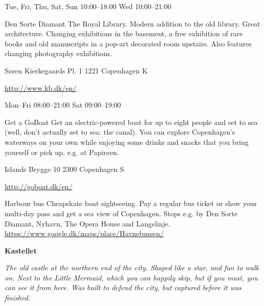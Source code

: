 \begin{left}
\begin{funitem}
{\begin{ohours}
{Tue, Fri, Thu, Sat, Sun}
{10:00–18:00}
{Wed}
{10:00–21:00}
{}
{}
{}
{}
\end{ohours}}
\end{funitem}
\begin{funitem}
{Den Sorte Diamant}
{The Royal Library. Modern addition to the old library. Great architecture. Changing exhibitions in the basement, a free exhibition of rare books and old manuscripts in a pop-art decorated room upstairs. Also features changing photography exhibitions.}
{\begin{addr}
{Søren Kierkegaards Pl. 1}
{1221 Copenhagen K}
\end{addr}}
{\url{http://www.kb.dk/en/}}
{\begin{ohours}
{Mon–Fri}
{08:00–21:00}
{Sat}
{09:00–19:00}
{}
{}
{}
{}
\end{ohours}}
\end{funitem}
\begin{funitem}
{Get a GoBoat}
{Get an electric-powered boat for up to eight people and set to sea (well, don’t actually set to sea: the canal). You can explore Copenhagen’s waterways on your own while enjoying some drinks and snacks that you bring yourself or pick up, e.g. at Papirøen.}
{\begin{addr}
{Islands Brygge 10}
{2300 Copenhagen S}
\end{addr}}
{\url{http://goboat.dk/en/}}
{\begin{ohours}
{}
{}
{}
{}
{}
{}
{}
{}
\end{ohours}}
\end{funitem}
\begin{funitemshort}
{Harbour bus}
{Cheapskate boat sightseeing. Pay a regular bus ticket or show your multi-day pass  and get a sea view of Copenhagen. Stops e.g. by Den Sorte Diamant, Nyhavn, The Opera House and Langelinje.}
{\url{https://www.google.dk/maps/place/Havnebussen/ }}
\end{funitemshort}
\noindent\textbf{Kastellet}
\par\noindent\emph{The old castle at the northern end of the city. Shaped like a star, and fun to walk on. Next to the Little Mermaid, which you can happily skip, but if you must, you can see it from here. Was built to defend the city, but captured before it was finished.}
\medskip


\end{left}
